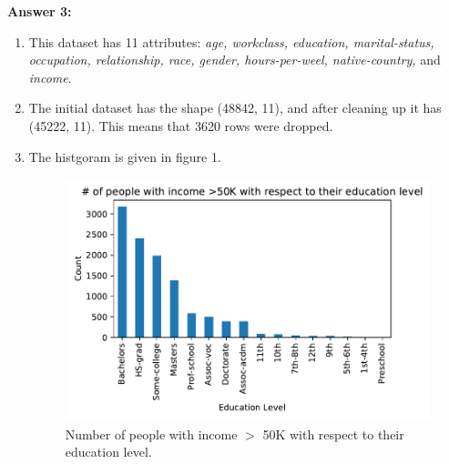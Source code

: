 \documentclass[12pt,reqno]{amsart}
\begin{document}
\vspace{20px}

\textbf{Answer 3:} 
\begin{enumerate}[label=\alph*.]
	\item This dataset has 11 attributes: \textit{age, workclass, education, marital-status, occupation, relationship, race, gender, hours-per-weel, native-country,} and \textit{income}. 
 	\item The initial dataset has the shape (48842, 11), and after cleaning up it has (45222, 11). This means that 3620 rows were dropped.
 	\item The histgoram is given in figure 1.
 	\begin{figure}
 	\label{fig:hist}
 	\caption{Number of people with income $>$ 50K with respect to their education level.}
 	\includegraphics[width=\linewidth]{histogram.pdf}
	 \end{figure}
	 	 	

\end{enumerate}
\end{document}
